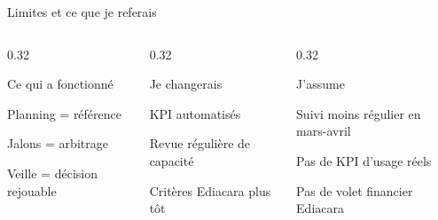 \begin{frame}{Limites et ce que je referais}
\begin{columns}[T]
\begin{column}{0.32\linewidth}
\begin{block}{Ce qui a fonctionné}
\small
\begin{tightitems}
  \item Planning = référence
  \item Jalons = arbitrage
  \item Veille = décision rejouable
\end{tightitems}
\end{block}
\end{column}
\begin{column}{0.32\linewidth}
\begin{block}{Je changerais}
\small
\begin{tightitems}
  \item KPI automatisés
  \item Revue régulière de capacité
  \item Critères Ediacara plus tôt
\end{tightitems}
\end{block}
\end{column}
\begin{column}{0.32\linewidth}
\begin{block}{J'assume}
\small
\begin{tightitems}
  \item Suivi moins régulier en mars-avril
  \item Pas de KPI d'usage réels
  \item Pas de volet financier Ediacara
\end{tightitems}
\end{block}
\end{column}
\end{columns}
\end{frame}

